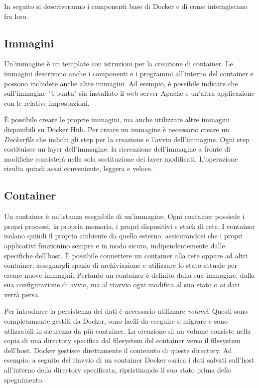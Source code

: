 In seguito si descriveranno i componenti base di Docker e di come interagiscano fra loro.

\subsection{Immagini}
Un'immagine è un template con istruzioni per la creazione di container. Le immagini descrivono anche i componenti e i programmi all'interno del container e possono includere anche altre immagini. Ad esempio, è possibile indicare che sull'immagine "Ubuntu" sia installato il web server Apache e un'altra applicazione con le relative impostazioni.

È possibile creare le proprie immagini, ma anche utilizzare altre immagini disponibili su Docker Hub. Per creare un immagine è necessario creare un \emph{Dockerfile} che indichi gli step per la creazione e l'avvio dell'immagine. Ogni step costituisce un layer dell'immagine: la ricreazione dell'immagine a fronte di modifiche consisterà nella sola sostituzione dei layer modificati. L'operazione risulta quindi assai conveniente, leggera e veloce.

\subsection{Container}
Un container è un'istanza eseguibile di un'immagine. Ogni container possiede i propri processi, la propria memoria, i propri dispositivi e stack di rete. I container isolano quindi il proprio ambiente da quello esterno, assicurandosi che i propri applicativi funzionino sempre e in modo sicuro, indipendentemente dalle specifiche dell'host. È possibile connettere un container alla rete oppure ad altri container, assegnargli spazio di archiviazione e utilizzare lo stato attuale per creare nuove immagini. Pertanto un container è definito dalla sua immagine, dalla sua configurazione di avvio, ma al riavvio ogni modifica al suo stato o ai dati verrà persa.

Per introdurre la persistenza dei dati è necessario utilizzare \emph{volumi}. Questi sono completamente gestiti da Docker, sono facili da eseguire o migrare e sono utlizzabili in sicurezza da più container. La creazione di un volume consiste nella copia di una directory specifica dal filesystem del container verso il filesystem dell'host. Docker gestisce direttamente il contenuto di queste directory. Ad esempio, a seguito del riavvio di un container Docker carica i dati salvati sull'host all'interno della directory specificata, ripristinando il suo stato prima dello spegnimento.

